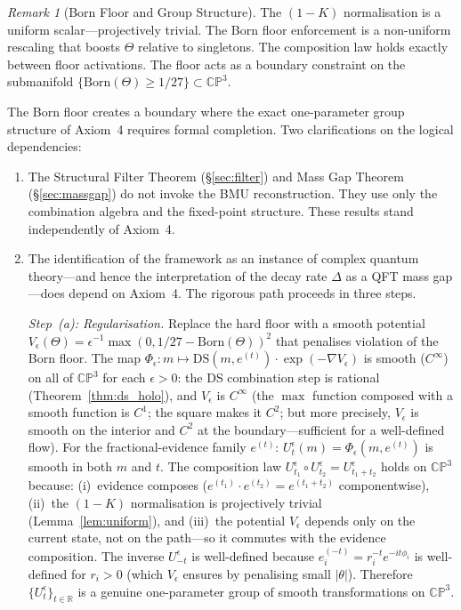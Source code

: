 \documentclass[11pt,a4paper]{article}
\theoremstyle{definition}
\theoremstyle{remark}
\newtheorem{remark}[theorem]{Remark}
\newcommand{\CP}{\mathbb{CP}}
\newcommand{\R}{\mathbb{R}}
\begin{document}
\begin{remark}[Born Floor and Group Structure]\label{rem:axiom4}
The $(1-K)$ normalisation is a uniform scalar---projectively trivial. The Born floor enforcement is a non-uniform rescaling that boosts $\Theta$ relative to singletons. The composition law holds exactly between floor activations. The floor acts as a boundary constraint on the submanifold $\{\mathrm{Born}(\Theta)\geq 1/27\}\subset\CP^3$.

The Born floor creates a boundary where the exact one-parameter group structure of Axiom~4 requires formal completion. Two clarifications on the logical dependencies:
\begin{enumerate}[nosep]
\item The Structural Filter Theorem (\S\ref{sec:filter}) and Mass Gap Theorem (\S\ref{sec:massgap}) do not invoke the BMU reconstruction. They use only the combination algebra and the fixed-point structure. These results stand independently of Axiom~4.
\item The identification of the framework as an instance of complex quantum theory---and hence the interpretation of the decay rate $\Delta$ as a QFT mass gap---does depend on Axiom~4. The rigorous path proceeds in three steps.

\emph{Step~(a): Regularisation.} Replace the hard floor with a smooth potential $V_\epsilon(\Theta)=\epsilon^{-1}\max(0,1/27-\mathrm{Born}(\Theta))^2$ that penalises violation of the Born floor. The map $\Phi_\epsilon:m\mapsto\mathrm{DS}(m,e^{(t)})\cdot\exp(-\nabla V_\epsilon)$ is smooth ($C^\infty$) on all of $\CP^3$ for each $\epsilon>0$: the DS combination step is rational (Theorem~\ref{thm:ds_holo}), and $V_\epsilon$ is $C^\infty$ (the $\max$ function composed with a smooth function is $C^1$; the square makes it $C^2$; but more precisely, $V_\epsilon$ is smooth on the interior and $C^2$ at the boundary---sufficient for a well-defined flow). For the fractional-evidence family $e^{(t)}$: $U_t^\epsilon(m)=\Phi_\epsilon(m,e^{(t)})$ is smooth in both $m$ and $t$. The composition law $U_{t_1}^\epsilon\circ U_{t_2}^\epsilon=U_{t_1+t_2}^\epsilon$ holds on $\CP^3$ because: (i)~evidence composes ($e^{(t_1)}\cdot e^{(t_2)}=e^{(t_1+t_2)}$ componentwise), (ii)~the $(1-K)$ normalisation is projectively trivial (Lemma~\ref{lem:uniform}), and (iii)~the potential $V_\epsilon$ depends only on the current state, not on the path---so it commutes with the evidence composition. The inverse $U_{-t}^\epsilon$ is well-defined because $e^{(-t)}_i=r_i^{-t}e^{-it\phi_i}$ is well-defined for $r_i>0$ (which $V_\epsilon$ ensures by penalising small $|\theta|$). Therefore $\{U_t^\epsilon\}_{t\in\R}$ is a genuine one-parameter group of smooth transformations on $\CP^3$.


\end{enumerate}
\end{remark}
\end{document}
